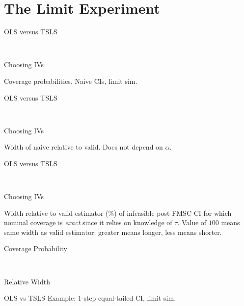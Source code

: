 \documentclass[12pt,letterpaper]{article}
\begin{document}
\section{The Limit Experiment}

\begin{table}[h]
  \centering
  \begin{subtable}{0.48\textwidth}
    \caption{OLS versus TSLS}
    
  \end{subtable}
  ~
  \begin{subtable}{0.48\textwidth}
    \caption{Choosing IVs}
    
  \end{subtable}
  \label{tab:LimitNaiveCover}
  \caption{Coverage probabilities, Naive CIs, limit sim.}
\end{table}

\begin{table}[h]
  \centering
  \begin{subtable}{0.48\textwidth}
    \caption{OLS versus TSLS}
    
  \end{subtable}
  ~
  \begin{subtable}{0.48\textwidth}
    \caption{Choosing IVs}
    
  \end{subtable}
  \label{tab:LimitNaiveWidth}
  \caption{Width of naive relative to valid. Does not depend on $\alpha$.}
\end{table}

\begin{table}[h]
  \centering
  \begin{subtable}{0.48\textwidth}
    \caption{OLS versus TSLS}
    
  \end{subtable}
  ~
  \begin{subtable}{0.48\textwidth}
    \caption{Choosing IVs}
    
  \end{subtable}
  \label{tab:WidthInfeasible}
  \caption{Width relative to valid estimator (\%) of infeasible post-FMSC CI for which nominal coverage is \emph{exact} since it relies on knowledge of $\tau$. Value of $100$ means same width as valid estimator: greater means longer, less means shorter.}
\end{table}

\begin{table}[h]
  \centering
  \begin{subtable}{0.48\textwidth}
    \caption{Coverage Probability}
    
  \end{subtable}
  ~
  \begin{subtable}{0.48\textwidth}
    \caption{Relative Width}
    
  \end{subtable}
  \label{tab:Limit1StepEqualOLSvsIV}
  \caption{OLS vs TSLS Example: 1-step equal-tailed CI, limit sim.}
\end{table}
\end{document}
